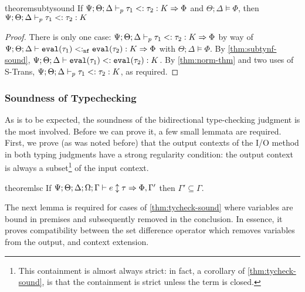 \begin{restatable}{theorem}{subtysound}
If $\Psi ; \Theta ; \Delta \vdash_p \tau_1 <:\tau_2 : K \Rightarrow \Phi$ and $\Theta ; \Delta \vDash \Phi$, then $\Psi ; \Theta ; \Delta \vdash_p \tau_1 <: \tau_2 : K$
\label{thm:subty-sound}
\end{restatable}
\begin{proof}
There is only one case: $\Psi ; \Theta ; \Delta \vdash_p \tau_1 <:\tau_2 : K \Rightarrow \Phi$ by way of $\Psi ; \Theta ; \Delta \vdash \texttt{eval}(\tau_1) <:_{\texttt{nf}} \texttt{eval}(\tau_2) : K \Rightarrow \Phi$ with $\Theta ; \Delta \vDash \Phi$. By \autoref{thm:subtynf-sound}, $\Psi ; \Theta ; \Delta \vdash \texttt{eval}(\tau_1) <: \texttt{eval}(\tau_2) : K$. By \autoref{thm:norm-thm} and two uses of S-Trans, $\Psi ; \Theta ; \Delta \vdash_p \tau_1 <: \tau_2 : K$, as required.
\end{proof}

\subsubsection{Soundness of Typechecking}

As is to be expected, the soundness of the bidirectional type-checking judgment is the most involved. Before we can prove it, a few small lemmata are required.
First, we prove (as was noted before) that the output contexts of the I/O method in both typing judgments have a strong regularity condition: the output context is always a subset\footnote{
This containment is almost always strict: in fact, a corollary of \autoref{thm:tycheck-sound}, is that the containment is strict unless the term is closed.
}
of the input context.

\begin{restatable}{theorem}{lsc}
If $\Psi ; \Theta ; \Delta ; \Omega ; \Gamma \vdash e \updownarrow \tau \Rightarrow \Phi, \Gamma'$ then $\Gamma' \subseteq \Gamma$.
\label{thm:lsc}
\end{restatable}

The next lemma is required for cases of \autoref{thm:tycheck-sound} where variables are bound in premises and subsequently removed in the conclusion. In essence, it proves compatibility between the set difference operator which removes variables from the output, and context extension.

